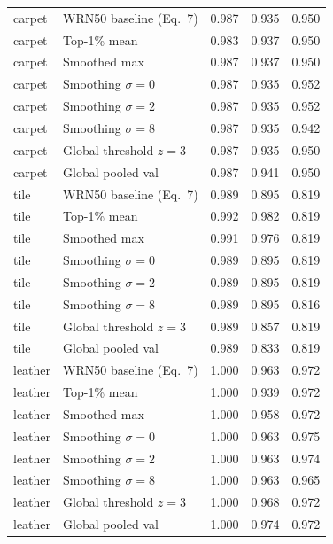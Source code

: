 \begin{tabular}{@{}llrrr@{}}
\midrule
carpet & WRN50 baseline (Eq.~7) & 0.987 & 0.935 & 0.950 \\
carpet & Top-1\% mean & 0.983 & 0.937 & 0.950 \\
carpet & Smoothed max & 0.987 & 0.937 & 0.950 \\
carpet & Smoothing $\sigma=0$ & 0.987 & 0.935 & 0.952 \\
carpet & Smoothing $\sigma=2$ & 0.987 & 0.935 & 0.952 \\
carpet & Smoothing $\sigma=8$ & 0.987 & 0.935 & 0.942 \\
carpet & Global threshold $z=3$ & 0.987 & 0.935 & 0.950 \\
carpet & Global pooled val & 0.987 & 0.941 & 0.950 \\
\midrule
tile & WRN50 baseline (Eq.~7) & 0.989 & 0.895 & 0.819 \\
tile & Top-1\% mean & 0.992 & 0.982 & 0.819 \\
tile & Smoothed max & 0.991 & 0.976 & 0.819 \\
tile & Smoothing $\sigma=0$ & 0.989 & 0.895 & 0.819 \\
tile & Smoothing $\sigma=2$ & 0.989 & 0.895 & 0.819 \\
tile & Smoothing $\sigma=8$ & 0.989 & 0.895 & 0.816 \\
tile & Global threshold $z=3$ & 0.989 & 0.857 & 0.819 \\
tile & Global pooled val & 0.989 & 0.833 & 0.819 \\
\midrule
leather & WRN50 baseline (Eq.~7) & 1.000 & 0.963 & 0.972 \\
leather & Top-1\% mean & 1.000 & 0.939 & 0.972 \\
leather & Smoothed max & 1.000 & 0.958 & 0.972 \\
leather & Smoothing $\sigma=0$ & 1.000 & 0.963 & 0.975 \\
leather & Smoothing $\sigma=2$ & 1.000 & 0.963 & 0.974 \\
leather & Smoothing $\sigma=8$ & 1.000 & 0.963 & 0.965 \\
leather & Global threshold $z=3$ & 1.000 & 0.968 & 0.972 \\
leather & Global pooled val & 1.000 & 0.974 & 0.972 \\
\bottomrule
\end{tabular}
